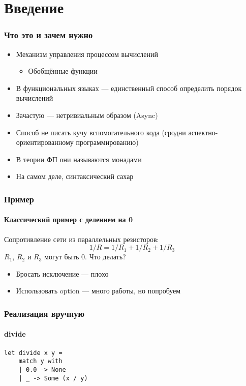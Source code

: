 \documentclass{../../slides-style}
\begin{document}
    \begin{frame}[plain]
        \titlepage
    \end{frame}

    \section{Введение}

    \begin{frame}
        \frametitle{Что это и зачем нужно}
        \begin{itemize}
            \item Механизм управления процессом вычислений
            \begin{itemize}
                \item Обобщённые функции
            \end{itemize}
            \item В функциональных языках --- единственный способ определить порядок вычислений
            \item Зачастую --- нетривиальным образом (Async)
            \item Способ не писать кучу вспомогательного кода (сродни аспектно-ориентированному программированию)
            \item В теории ФП они называются монадами
            \item На самом деле, синтаксический сахар
        \end{itemize}
    \end{frame}

    \begin{frame}
        \frametitle{Пример}
        \framesubtitle{Классический пример с делением на 0}
        Сопротивление сети из параллельных резисторов:
        $$1/R = 1/R_1 + 1/R_2 + 1/R_3$$
        $R_1$, $R_2$ и $R_3$ могут быть 0. Что делать?
        \begin{itemize}
            \item Бросать исключение --- плохо
            \item Использовать option --- много работы, но попробуем
        \end{itemize}
    \end{frame}

    \begin{frame}[fragile]
        \frametitle{Реализация вручную}
        \framesubtitle{divide}
        \begin{verbatim}
let divide x y =
    match y with
    | 0.0 -> None
    | _ -> Some (x / y)
        \end{verbatim}
    \end{frame}
\end{document}
